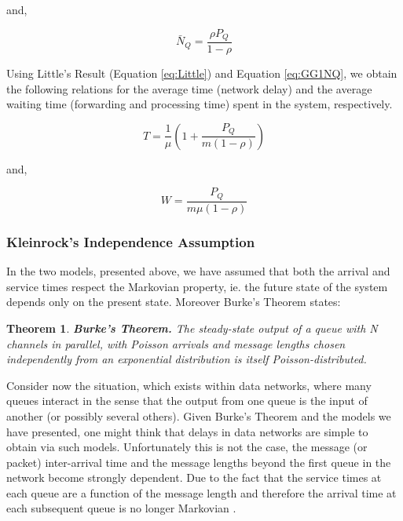 and,

\begin{equation}
\bar{N}_Q = \frac{\rho P_{Q}}{1 - \rho}
\label{eq:MMMNQ} 
\end{equation}


Using Little's Result (Equation \ref{eq:Little}) and Equation \ref{eq:GG1NQ}, we obtain the following relations for the average time (network delay) and the average waiting time (forwarding and processing time) spent in the system, respectively.

\begin{equation}
 T = \frac{1}{\mu}\left(1 + \frac{P_{Q}}{m(1-\rho)}\right)
\label{eq:MMMT} 
\end{equation}

and,

\begin{equation}
 W = \frac{P_{Q}}{m\mu\left(1-\rho\right)}
\label{eq:MMMW} 
\end{equation}

\subsubsection{Kleinrock's Independence Assumption}
\label{sect:kleindep}
In the two models, presented above, we have assumed that both the arrival and service times respect the Markovian property, ie. the future state of the system depends only on the present state. Moreover Burke's Theorem \cite{Burke} states:

\newtheorem{theorem}{Theorem}
\begin{theorem}
\label{th:Burke}
\textbf{Burke's Theorem.} The steady-state output of a queue with N channels in parallel, with Poisson arrivals and message lengths chosen independently from an exponential distribution is itself Poisson-distributed. 
\end{theorem}

Consider now the situation, which exists within data networks, where many queues interact in the sense that the output from one queue is the input of another (or possibly several others). Given Burke's Theorem and the models we have presented, one might think that delays in data networks are simple to obtain via such models. Unfortunately this is not the case, the message (or packet) inter-arrival time and the message lengths beyond the first queue in the network become strongly dependent. Due to the fact that the service times at each queue are a function of the message length and therefore the arrival time at each subsequent queue is no longer Markovian \cite{CommNets}.

